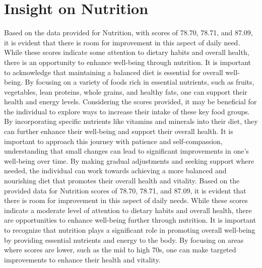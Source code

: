 \documentclass[10pt, a4paper]{article}%
\begin{document}
\section{Insight on Nutrition}%
\label{sec:InsightonNutrition}%
Based on the data provided for Nutrition, with scores of 78.70, 78.71, and 87.09, it is evident that there is room for improvement in this aspect of daily need. While these scores indicate some attention to dietary habits and overall health, there is an opportunity to enhance well{-}being through nutrition.\newline%
\newline%
It is important to acknowledge that maintaining a balanced diet is essential for overall well{-}being. By focusing on a variety of foods rich in essential nutrients, such as fruits, vegetables, lean proteins, whole grains, and healthy fats, one can support their health and energy levels.\newline%
\newline%
Considering the scores provided, it may be beneficial for the individual to explore ways to increase their intake of these key food groups. By incorporating specific nutrients like vitamins and minerals into their diet, they can further enhance their well{-}being and support their overall health.\newline%
\newline%
It is important to approach this journey with patience and self{-}compassion, understanding that small changes can lead to significant improvements in one's well{-}being over time. By making gradual adjustments and seeking support where needed, the individual can work towards achieving a more balanced and nourishing diet that promotes their overall health and vitality.\newline%
\newline%
Based on the provided data for Nutrition scores of 78.70, 78.71, and 87.09, it is evident that there is room for improvement in this aspect of daily needs. While these scores indicate a moderate level of attention to dietary habits and overall health, there are opportunities to enhance well{-}being further through nutrition.\newline%
\newline%
It is important to recognize that nutrition plays a significant role in promoting overall well{-}being by providing essential nutrients and energy to the body. By focusing on areas where scores are lower, such as the mid to high 70s, one can make targeted improvements to enhance their health and vitality.\newline%
\end{document}
